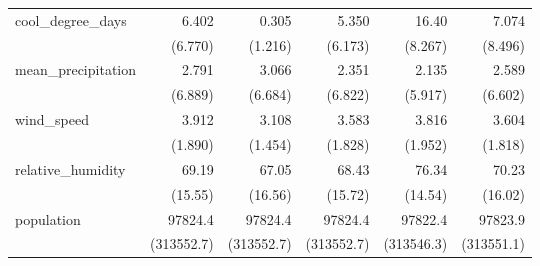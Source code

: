 \begin{table}[htbp]
\begin{tabular}{l*{5}{D{.}{.}{-1}}}
\addlinespace
cool\_degree\_days    &       6.402&       0.305&       5.350&       16.40&       7.074\\
                    &     (6.770)&     (1.216)&     (6.173)&     (8.267)&     (8.496)\\
\addlinespace
mean\_precipitation  &       2.791&       3.066&       2.351&       2.135&       2.589\\
                    &     (6.889)&     (6.684)&     (6.822)&     (5.917)&     (6.602)\\
\addlinespace
wind\_speed          &       3.912&       3.108&       3.583&       3.816&       3.604\\
                    &     (1.890)&     (1.454)&     (1.828)&     (1.952)&     (1.818)\\
\addlinespace
relative\_humidity   &       69.19&       67.05&       68.43&       76.34&       70.23\\
                    &     (15.55)&     (16.56)&     (15.72)&     (14.54)&     (16.02)\\
\addlinespace
population          &     97824.4&     97824.4&     97824.4&     97822.4&     97823.9\\
                    &  (313552.7)&  (313552.7)&  (313552.7)&  (313546.3)&  (313551.1)\\
\bottomrule
\end{tabular}
\end{table}
